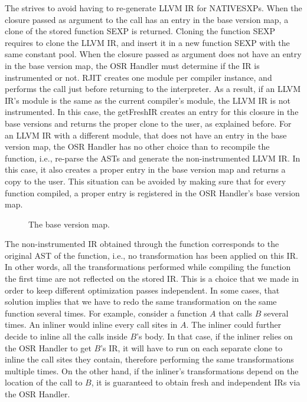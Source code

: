 The  strives to avoid having to re-generate LLVM IR for NATIVESXPs.
When the closure passed as argument to the  call has an entry in the base version map, a clone of the stored function SEXP is returned.
Cloning the function SEXP requires to clone the LLVM IR, and insert it in a new function SEXP with the same constant pool.
When the closure passed as argument does not have an entry in the base version map, the OSR Handler must determine if the IR is instrumented or not.
RJIT creates one module per compiler instance, and performs the  call just before returning to the interpreter.
As a result, if an LLVM IR's module is the same as the current compiler's module, the LLVM IR is not instrumented.
In this case, the getFreshIR creates an entry for this closure in the base versions and returns the proper clone to the user, as explained before.
For an LLVM IR with a different module, that does not have an entry in the base version map, the OSR Handler has no other choice than to recompile the function, i.e., re-parse the ASTs and generate the non-instrumented LLVM IR.
In this case, it also creates a proper entry in the base version map and returns a copy to the user.
This situation can be avoided by making sure that for every function compiled, a proper entry is registered in the OSR Handler's base version map.\\

\begin{figure}[h]
\caption{The base version map.}
\label{fig:baseversionmap}
\end{figure}

The non-instrumented IR obtained through the  function corresponds to the original AST of the function, i.e., no transformation has been applied on this IR. 
In other words, all the transformations performed while compiling the function the first time are not reflected on the stored IR. 
This is a choice that we made in order to keep different optimization passes independent.
In some cases, that solution implies that we have to redo the same transformation on the same function several times.
For example, consider a function $A$ that calls $B$ several times.
An inliner would inline every call sites in $A$.
The inliner could further decide to inline all the calls inside $B$'s body.
In that case, if the inliner relies on the OSR Handler to get $B$'s IR, it will have to run on each separate clone to inline the call sites they contain, therefore performing the same transformations multiple times.
On the other hand, if the inliner's transformations depend on the location of the call to $B$, it is guaranteed to obtain fresh and independent IRs via the OSR Handler.\\

